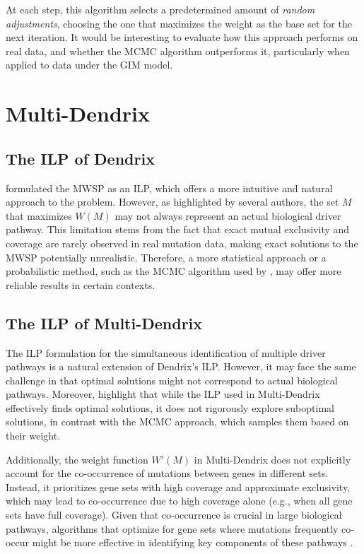 At each step, this algorithm selects a predetermined amount of \textit{random adjustments}, choosing the one that maximizes the weight as the base set for the next iteration. It would be interesting to evaluate how this approach performs on real data, and whether the MCMC algorithm outperforms it, particularly when applied to data under the GIM model.

\section{Multi-Dendrix}

\subsection{The ILP of Dendrix}

\textcite{multi-dendrix} formulated the MWSP as an ILP, which offers a more intuitive and natural approach to the problem. However, as highlighted by several authors, the set $M$ that maximizes $W(M)$ may not always represent an actual biological driver pathway. This limitation stems from the fact that exact mutual exclusivity and coverage are rarely observed in real mutation data, making exact solutions to the MWSP potentially unrealistic. Therefore, a more statistical approach or a probabilistic method, such as the MCMC algorithm used by \textcite{dendrix}, may offer more reliable results in certain contexts.

\subsection{The ILP of Multi-Dendrix}

The ILP formulation for the simultaneous identification of multiple driver pathways is a natural extension of Dendrix's ILP. However, it may face the same challenge in that optimal solutions might not correspond to actual biological pathways. Moreover, \textcite{multi-dendrix} highlight that while the ILP used in Multi-Dendrix effectively finds optimal solutions, it does not rigorously explore suboptimal solutions, in contrast with the MCMC approach, which samples them based on their weight.

Additionally, the weight function $W'(M)$ in Multi-Dendrix does not explicitly account for the co-occurrence of mutations between genes in different sets. Instead, it prioritizes gene sets with high coverage and approximate exclusivity, which may lead to co-occurrence due to high coverage alone (e.g., when all gene sets have full coverage). Given that co-occurrence is crucial in large biological pathways, algorithms that optimize for gene sets where mutations frequently co-occur might be more effective in identifying key components of these pathways \cite{multi-dendrix}.

